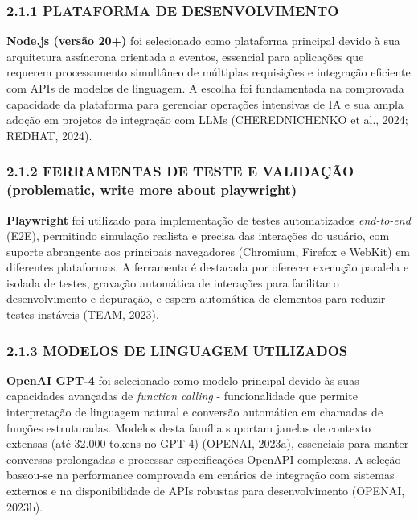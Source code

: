 \documentclass[
]{article}
\begin{document}
\subsubsection{2.1.1 PLATAFORMA DE
DESENVOLVIMENTO}\label{plataforma-de-desenvolvimento}

\textbf{Node.js (versão 20+)} foi selecionado como plataforma principal
devido à sua arquitetura assíncrona orientada a eventos, essencial para
aplicações que requerem processamento simultâneo de múltiplas
requisições e integração eficiente com APIs de modelos de linguagem. A
escolha foi fundamentada na comprovada capacidade da plataforma para
gerenciar operações intensivas de IA e sua ampla adoção em projetos de
integração com LLMs (CHEREDNICHENKO et al., 2024; REDHAT, 2024).

\subsubsection{2.1.2 FERRAMENTAS DE TESTE E VALIDAÇÃO (problematic,
write more about
playwright)}\label{ferramentas-de-teste-e-validauxe7uxe3o-problematic-write-more-about-playwright}

\textbf{Playwright} foi utilizado para implementação de testes
automatizados \emph{end-to-end} (E2E), permitindo simulação realista e
precisa das interações do usuário, com suporte abrangente aos principais
navegadores (Chromium, Firefox e WebKit) em diferentes plataformas. A
ferramenta é destacada por oferecer execução paralela e isolada de
testes, gravação automática de interações para facilitar o
desenvolvimento e depuração, e espera automática de elementos para
reduzir testes instáveis (TEAM, 2023).

\subsubsection{2.1.3 MODELOS DE LINGUAGEM
UTILIZADOS}\label{modelos-de-linguagem-utilizados}

\textbf{OpenAI GPT-4} foi selecionado como modelo principal devido às
suas capacidades avançadas de \emph{function calling} - funcionalidade
que permite interpretação de linguagem natural e conversão automática em
chamadas de funções estruturadas. Modelos desta família suportam janelas
de contexto extensas (até 32.000 tokens no GPT-4) (OPENAI, 2023a),
essenciais para manter conversas prolongadas e processar especificações
OpenAPI complexas. A seleção baseou-se na performance comprovada em
cenários de integração com sistemas externos e na disponibilidade de
APIs robustas para desenvolvimento (OPENAI, 2023b).
\end{document}
